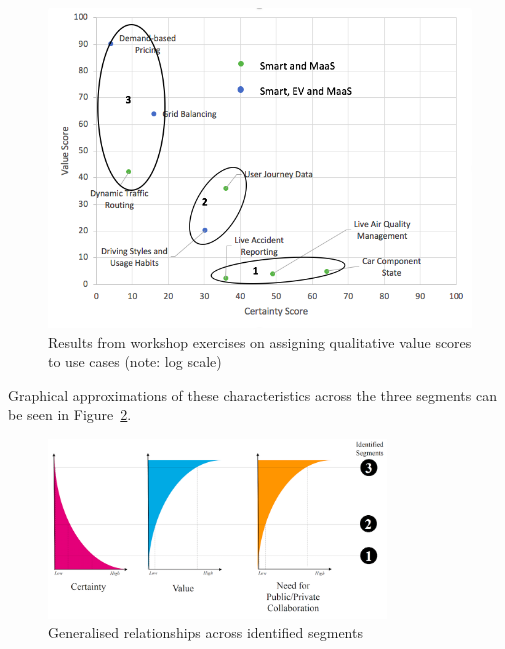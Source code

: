 \documentclass[b5paper,10pt]{article}
\begin{document}
\begin{figure}[ht]
\centering
\includegraphics[width=0.75\columnwidth]{images/valuegraph.png}
\caption{Results from workshop exercises on assigning qualitative
value scores to use cases (note: log scale)}
\label{fig:valuegraph}
\end{figure}

Graphical approximations of these characteristics across the three
segments can be seen in Figure~\ref{fig:segmentcharacteristics}.

\begin{figure}[!h]
\centering
\includegraphics[width=0.8\textwidth]{images/segmentcharacteristics.png}
\caption{Generalised relationships across identified segments}
\label{fig:segmentcharacteristics}
\end{figure}



\end{document}

